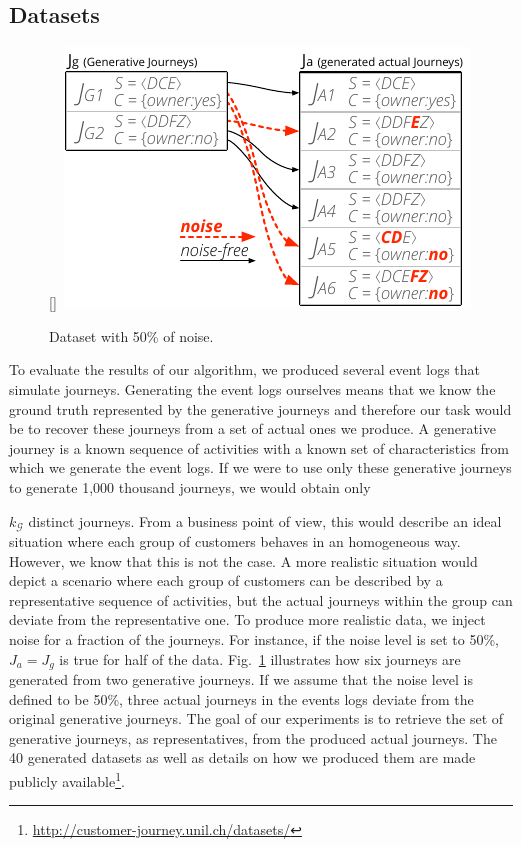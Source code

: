 \documentclass[runningheads]{llncs}
\begin{document}
{{\subsection{Datasets}


\begin{figure}
  \begin{center}
    \raisebox{0pt}[\dimexpr{}\baselineskip\relax]{\
\includegraphics[width=0.42\columnwidth]{05_schema/dataset.pdf}
    }
  \end{center}
  \vspace{-5pt}
  \caption{Dataset with 50\% of noise.}
  \label{fig:dataset}
\end{figure} 


To evaluate the results of our algorithm, we produced several event logs that simulate journeys. Generating the event logs ourselves means that we know the ground truth represented by the generative journeys and therefore our task would be to recover these journeys from a set of actual ones we produce. A generative journey is a known sequence of activities with a known set of characteristics from which we generate the event logs. If we were to use only these generative journeys to generate 1,000 thousand journeys, we would obtain only {$k_{\mathcal{G}}$ distinct journeys. From a business point of view, this would describe an ideal situation where each group of customers behaves in an homogeneous way. However, we know that this is not the case. A more realistic situation would depict a scenario where each group of customers can be described by a representative sequence of activities, but the actual journeys within the group can deviate from the representative one. To produce more realistic data, we inject noise for a fraction of the journeys. For instance, if the noise level is set to 50\%, $J_a = J_g$ is true for half of the data. Fig.~\ref{fig:dataset} illustrates how six journeys are generated from two generative journeys. If we assume that the noise level is defined to be 50\%, three actual journeys in the events logs deviate from the original generative journeys. The goal of our experiments is to retrieve the set of generative journeys, as representatives, from the produced actual journeys. The 40 generated datasets as well as details on how we produced them are made publicly available\footnote{\url{http://customer-journey.unil.ch/datasets/}}.

}}}
\end{document}
